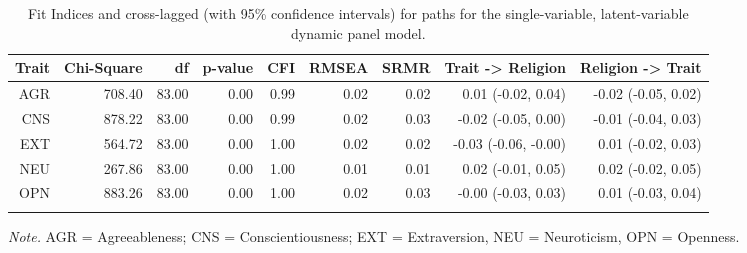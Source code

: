 \documentclass[
  man,floatsintext]{apa6}
\begin{document}
\begin{table}[t]

\begin{center}
\begin{threeparttable}

\caption{\label{tab:dpmLatentResults}Fit Indices and cross-lagged (with 95\% confidence intervals) for paths for the single-variable, latent-variable dynamic panel model.}

\begin{tabular}{rrrrrrrrr}
\toprule
Trait & Chi-Square & df & p-value & CFI & RMSEA & SRMR & Trait -> Religion & Religion -> Trait\\
\midrule
AGR & 708.40 & 83.00 & 0.00 & 0.99 & 0.02 & 0.02 & 0.01 (-0.02, 0.04) & -0.02 (-0.05, 0.02)\\
CNS & 878.22 & 83.00 & 0.00 & 0.99 & 0.02 & 0.03 & -0.02 (-0.05, 0.00) & -0.01 (-0.04, 0.03)\\
EXT & 564.72 & 83.00 & 0.00 & 1.00 & 0.02 & 0.02 & -0.03 (-0.06, -0.00) & 0.01 (-0.02, 0.03)\\
NEU & 267.86 & 83.00 & 0.00 & 1.00 & 0.01 & 0.01 & 0.02 (-0.01, 0.05) & 0.02 (-0.02, 0.05)\\
OPN & 883.26 & 83.00 & 0.00 & 1.00 & 0.02 & 0.03 & -0.00 (-0.03, 0.03) & 0.01 (-0.03, 0.04)\\
\bottomrule
\addlinespace
\end{tabular}

\begin{tablenotes}[para]
\normalsize{\textit{Note.} AGR = Agreeableness; CNS = Conscientiousness; EXT = Extraversion, NEU = Neuroticism, OPN = Openness.}
\end{tablenotes}

\end{threeparttable}
\end{center}

\end{table}
\end{document}
